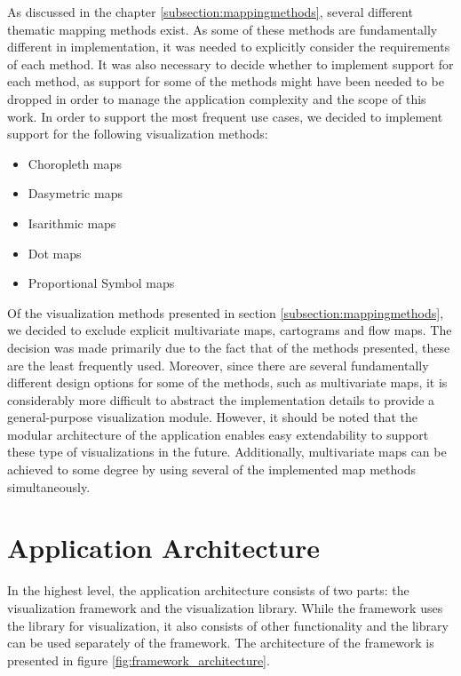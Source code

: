 As discussed in the chapter \ref{subsection:mappingmethods}, several different thematic mapping methods exist. As some of these methods are fundamentally different in implementation, it was needed to explicitly consider the requirements of each method. It was also necessary to decide whether to implement support for each method, as support for some of the methods might have been needed to be dropped in order to manage the application complexity and the scope of this work. In order to support the most frequent use cases, we decided to implement support for the following visualization methods:

\begin{itemize}
	\item Choropleth maps
	\item Dasymetric maps
	\item Isarithmic maps
	\item Dot maps
	\item Proportional Symbol maps
\end{itemize}

Of the visualization methods presented in section \ref{subsection:mappingmethods}, we decided to exclude explicit multivariate maps, cartograms and flow maps. The decision was made primarily due to the fact that of the methods presented, these are the least frequently used. Moreover, since there are several fundamentally different design options for some of the methods, such as multivariate maps, it is considerably more difficult to abstract the implementation details to provide a general-purpose visualization module. However, it should be noted that the modular architecture of the application enables easy extendability to support these type of visualizations in the future. Additionally, multivariate maps can be achieved to some degree by using several of the implemented map methods simultaneously.

\section{Application Architecture}

In the highest level, the application architecture consists of two parts: the visualization framework and the visualization library. While the framework uses the library for visualization, it also consists of other functionality and the library can be used separately of the framework. The architecture of the framework is presented in figure \ref{fig:framework_architecture}.

